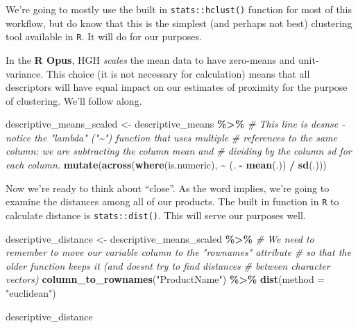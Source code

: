 \documentclass[
]{book}
\newenvironment{Shaded}{\begin{snugshade}}{\end{snugshade}}
\newcommand{\AttributeTok}[1]{\textcolor[rgb]{0.13,0.29,0.53}{#1}}
\newcommand{\CommentTok}[1]{\textcolor[rgb]{0.56,0.35,0.01}{\textit{#1}}}
\newcommand{\FunctionTok}[1]{\textcolor[rgb]{0.13,0.29,0.53}{\textbf{#1}}}
\newcommand{\NormalTok}[1]{#1}
\newcommand{\OtherTok}[1]{\textcolor[rgb]{0.56,0.35,0.01}{#1}}
\newcommand{\SpecialCharTok}[1]{\textcolor[rgb]{0.81,0.36,0.00}{\textbf{#1}}}
\newcommand{\StringTok}[1]{\textcolor[rgb]{0.31,0.60,0.02}{#1}}
\begin{document}
We're going to mostly use the built in \texttt{stats::hclust()} function for most of this workflow, but do know that this is the simplest (and perhaps not best) clustering tool available in \texttt{R}. It will do for our purposes.

In the \textbf{R Opus}, HGH \emph{scales} the mean data to have zero-means and unit-variance. This choice (it is not necessary for calculation) means that all descriptors will have equal impact on our estimates of proximity for the purpose of clustering. We'll follow along.

\begin{Shaded}
\begin{Highlighting}[]
\NormalTok{descriptive\_means\_scaled }\OtherTok{\textless{}{-}} 
\NormalTok{  descriptive\_means }\SpecialCharTok{\%\textgreater{}\%}
  \CommentTok{\# This line is desnse {-} notice the "lambda" ("\textasciitilde{}") function that uses multiple}
  \CommentTok{\# references to the same column: we are subtracting the column mean and}
  \CommentTok{\# dividing by the column sd for each column.}
  \FunctionTok{mutate}\NormalTok{(}\FunctionTok{across}\NormalTok{(}\FunctionTok{where}\NormalTok{(is.numeric), }\SpecialCharTok{\textasciitilde{}}\NormalTok{ (. }\SpecialCharTok{{-}} \FunctionTok{mean}\NormalTok{(.)) }\SpecialCharTok{/} \FunctionTok{sd}\NormalTok{(.)))}
\end{Highlighting}
\end{Shaded}

Now we're ready to think about ``close''. As the word implies, we're going to examine the distances among all of our products. The built in function in \texttt{R} to calculate distance is \texttt{stats::dist()}. This will serve our purposes well.

\begin{Shaded}
\begin{Highlighting}[]
\NormalTok{descriptive\_distance }\OtherTok{\textless{}{-}} 
\NormalTok{  descriptive\_means\_scaled }\SpecialCharTok{\%\textgreater{}\%}
  \CommentTok{\# We need to remember to move our variable column to the "rownames" attribute}
  \CommentTok{\# so that the older function keeps it (and doesn\textquotesingle{}t try to find distances}
  \CommentTok{\# between character vectors)}
  \FunctionTok{column\_to\_rownames}\NormalTok{(}\StringTok{"ProductName"}\NormalTok{) }\SpecialCharTok{\%\textgreater{}\%}
  \FunctionTok{dist}\NormalTok{(}\AttributeTok{method =} \StringTok{"euclidean"}\NormalTok{)}

\NormalTok{descriptive\_distance}
\end{Highlighting}
\end{Shaded}
\end{document}
